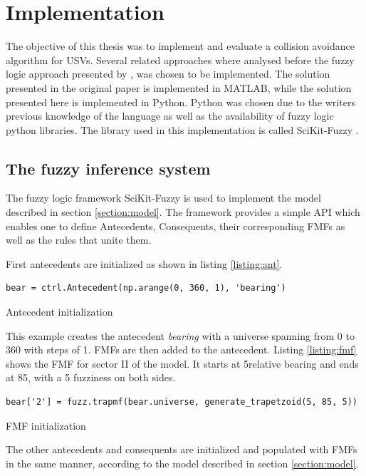 

\chapter{Implementation}
The objective of this thesis was to implement and evaluate a  collision avoidance  algorithm for USVs. Several related approaches where analysed before the fuzzy logic approach presented by \textcite{perera2012intelligent}, was chosen to be implemented.
The solution presented in the original paper is implemented in MATLAB, while the solution presented here is implemented in Python. Python was chosen due to the writers previous knowledge of the language as well as the availability of fuzzy logic python libraries. The library used in this implementation is called SciKit-Fuzzy \cite{josh_warner_2017_1002946}.

\section{The fuzzy inference system}
The fuzzy logic framework SciKit-Fuzzy is used to implement the model described in section \ref{section:model}. The framework provides a simple API which enables one to define Antecedents, Consequents, their corresponding FMFs as well as the rules that unite them.

First antecedents are initialized as shown in listing \ref{listing:ant}.
\begin{listing}[ht]
    \begin{verbatim}
bear = ctrl.Antecedent(np.arange(0, 360, 1), 'bearing')
\end{verbatim}
    \caption{Antecedent initialization}
    \label{listing:ant}
\end{listing}
This example creates the antecedent \textit{bearing} with a universe spanning from 0 to 360 with steps of 1. FMFs are then added to the antecedent. Listing \ref{listing:fmf} shows the FMF for sector II of the model. It starts at 5\textdegree relative bearing and ends at 85\textdegree, with a 5 \textdegree  fuzziness on both sides.
\begin{listing}[ht]
    \begin{verbatim}
bear['2'] = fuzz.trapmf(bear.universe, generate_trapetzoid(5, 85, 5))
\end{verbatim}
    \caption{FMF initialization}
    \label{listing:fmf}
\end{listing}

The other antecedents and consequents are initialized and populated with FMFs in the same manner, according to the model described in section \ref{section:model}.

